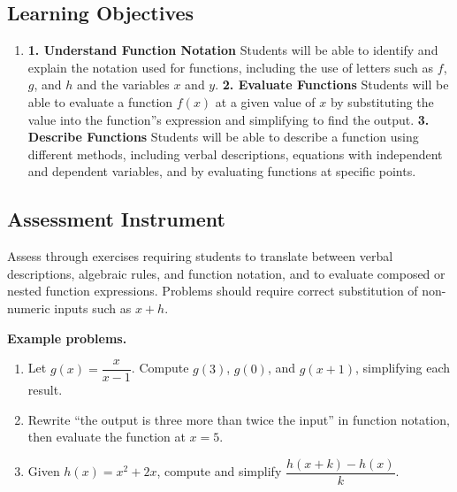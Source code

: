 \subsection{Learning Objectives}
\label{ssec:lear-2f05}

\begin{enumerate}
    \item \textbf{1. Understand Function Notation} Students will be able to identify and explain the notation used for functions, including the use of letters such as $f$, $g$, and $h$ and the variables $x$ and $y$. \textbf{2. Evaluate Functions} Students will be able to evaluate a function $f(x)$ at a given value of $x$ by substituting the value into the function''s expression and simplifying to find the output. \textbf{3. Describe Functions} Students will be able to describe a function using different methods, including verbal descriptions, equations with independent and dependent variables, and by evaluating functions at specific points.
\end{enumerate}

\subsection{Assessment Instrument}
\label{ssec:asse-80b4}

Assess through exercises requiring students to translate between verbal descriptions,
algebraic rules, and function notation, and to evaluate composed or nested function
expressions. Problems should require correct substitution of non-numeric inputs such as $x
+ h$.

\textbf{Example problems.}

\begin{enumerate}
    \item Let $g(x) = \dfrac{x}{x-1}$. Compute $g(3)$, $g(0)$, and $g(x+1)$, simplifying each result.
    \item Rewrite ``the output is three more than twice the input'' in function notation, then evaluate the function at $x = 5$.
    \item Given $h(x) = x^2 + 2x$, compute and simplify $\dfrac{h(x+k) - h(x)}{k}$.
\end{enumerate}

